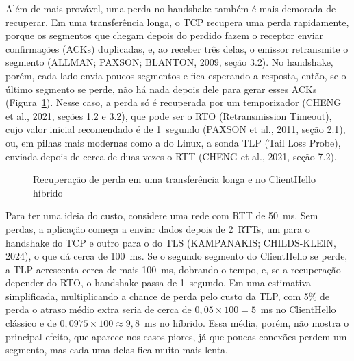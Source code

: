 \documentclass[12pt,a4paper]{article}
\newcommand{\fonte}[1]{\par\vspace{4pt}{\small Fonte: #1}}
\begin{document}
Além de mais provável, uma perda no handshake também é mais demorada de
recuperar. Em uma
transferência longa, o TCP recupera uma perda rapidamente, porque
os segmentos que chegam depois do perdido fazem o receptor enviar
confirmações (ACKs) duplicadas, e, ao receber três delas, o emissor
retransmite o segmento
(ALLMAN; PAXSON; BLANTON, 2009, seção 3.2). No handshake, porém, cada lado
envia poucos segmentos e fica esperando a resposta, então, se o último
segmento se perde, não há nada depois dele para gerar esses ACKs
(Figura~\ref{fig:cauda}). Nesse caso, a perda só é recuperada por um temporizador (CHENG et al.,
2021, seções 1.2 e 3.2), que pode ser o RTO (Retransmission Timeout), cujo
valor inicial recomendado é de 1~segundo (PAXSON et al., 2011, seção 2.1),
ou, em pilhas mais modernas como a do Linux, a sonda TLP (Tail Loss Probe),
enviada depois de cerca
de duas vezes o RTT (CHENG et al., 2021, seção 7.2).

\begin{figure}[H]
\centering
\caption{Recuperação de perda em uma transferência longa e no ClientHello híbrido}
\label{fig:cauda}
\fonte{Elaborado pelos autores com base em Allman, Paxson e Blanton (2009) e Cheng et al. (2021).}
\end{figure}

Para ter uma ideia do custo, considere uma rede com RTT de 50~ms. Sem
perdas, a aplicação começa a enviar dados depois de 2~RTTs, um para o
handshake do TCP e outro para o do TLS (KAMPANAKIS; CHILDS-KLEIN, 2024), o
que dá cerca de 100~ms. Se o segundo segmento do ClientHello se
perde, a TLP acrescenta cerca de mais 100~ms, dobrando o tempo, e, se a
recuperação depender do RTO, o handshake passa de 1~segundo. Em uma
estimativa simplificada, multiplicando a chance de perda pelo custo da
TLP, com 5\% de perda o atraso médio extra seria de cerca de
$0{,}05 \times 100 = 5$~ms no ClientHello clássico e de
$0{,}0975 \times 100 \approx 9{,}8$~ms no híbrido. Essa média, porém, não mostra o principal efeito, que aparece nos casos
piores, já que poucas conexões perdem um segmento, mas cada uma delas fica
muito mais lenta.
\end{document}
